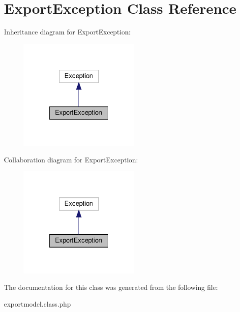 \hypertarget{classExportException}{}\section{Export\+Exception Class Reference}
\label{classExportException}


Inheritance diagram for Export\+Exception\+:
\nopagebreak
\begin{figure}[H]
\begin{center}
\leavevmode
\includegraphics[width=169pt]{classExportException__inherit__graph}
\end{center}
\end{figure}


Collaboration diagram for Export\+Exception\+:
\nopagebreak
\begin{figure}[H]
\begin{center}
\leavevmode
\includegraphics[width=169pt]{classExportException__coll__graph}
\end{center}
\end{figure}


The documentation for this class was generated from the following file\+:\begin{DoxyCompactItemize}
\item 
exportmodel.\+class.\+php\end{DoxyCompactItemize}
